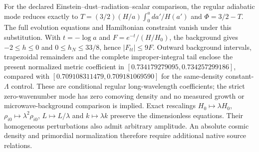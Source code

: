 For the declared Einstein--dust--radiation--scalar comparison, the regular
adiabatic mode reduces exactly to
$T=(3/2)(H/a)\int_0^a da'/H(a')$ and $\Phi=3/2-T$.
The full evolution equations and Hamiltonian constraint vanish under this
substitution. With $t=-\log a$ and $F=e^{-t}/(H/H_0)$, the background gives
$-2\leq h\leq0$ and $0\leq h_N\leq33/8$, hence $|F_{tt}|\leq9F$.
Outward background intervals, trapezoidal remainders and the complete
improper-integral tail enclose the present normalized metric coefficient
in $[0.734179279095,0.734257299186]$, compared with
$[0.709108311479,0.709181069590]$ for the same-density constant-$\Lambda$
control. These are conditional regular long-wavelength coefficients;
the strict zero-wavenumber mode has zero comoving density and no measured
growth or microwave-background comparison is implied. Exact rescalings
$H_0\mapsto\lambda H_0$, $\rho_{i0}\mapsto\lambda^2\rho_{i0}$,
$L\mapsto L/\lambda$ and $k\mapsto\lambda k$ preserve the dimensionless
equations. Their homogeneous perturbations also admit arbitrary amplitude.
An absolute cosmic density and primordial normalization therefore require
additional native source relations.
